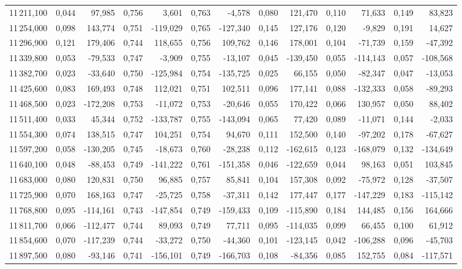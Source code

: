 \begin{longtable}{rrrrrrrrrrrrr}
11\,211,100 & 0,044 & 97,985 & 0,756 & 3,601 & 0,763 & -4,578 & 0,080 & 121,470 & 0,110 & 71,633 & 0,149 & 83,823\\
11\,254,000 & 0,098 & 143,774 & 0,751 & -119,029 & 0,765 & -127,340 & 0,145 & 127,176 & 0,120 & -9,829 & 0,191 & 14,627\\
11\,296,900 & 0,121 & 179,406 & 0,744 & 118,655 & 0,756 & 109,762 & 0,146 & 178,001 & 0,104 & -71,739 & 0,159 & -47,392\\
11\,339,800 & 0,053 & -79,533 & 0,747 & -3,909 & 0,755 & -13,107 & 0,045 & -139,450 & 0,055 & -114,143 & 0,057 & -108,568\\
11\,382,700 & 0,023 & -33,640 & 0,750 & -125,984 & 0,754 & -135,725 & 0,025 & 66,155 & 0,050 & -82,347 & 0,047 & -13,053\\
11\,425,600 & 0,083 & 169,493 & 0,748 & 112,021 & 0,751 & 102,511 & 0,096 & 177,141 & 0,088 & -132,333 & 0,058 & -89,293\\
11\,468,500 & 0,023 & -172,208 & 0,753 & -11,072 & 0,753 & -20,646 & 0,055 & 170,422 & 0,066 & 130,957 & 0,050 & 88,402\\
11\,511,400 & 0,033 & 45,344 & 0,752 & -133,787 & 0,755 & -143,094 & 0,065 & 77,420 & 0,089 & -11,071 & 0,144 & -2,033\\
11\,554,300 & 0,074 & 138,515 & 0,747 & 104,251 & 0,754 & 94,670 & 0,111 & 152,500 & 0,140 & -97,202 & 0,178 & -67,627\\
11\,597,200 & 0,058 & -130,205 & 0,745 & -18,673 & 0,760 & -28,238 & 0,112 & -162,615 & 0,123 & -168,079 & 0,132 & -134,649\\
11\,640,100 & 0,048 & -88,453 & 0,749 & -141,222 & 0,761 & -151,358 & 0,046 & -122,659 & 0,044 & 98,163 & 0,051 & 103,845\\
11\,683,000 & 0,080 & 120,831 & 0,750 & 96,885 & 0,757 & 85,841 & 0,104 & 157,308 & 0,092 & -75,972 & 0,128 & -37,507\\
11\,725,900 & 0,070 & 168,163 & 0,747 & -25,725 & 0,758 & -37,311 & 0,142 & 177,447 & 0,177 & -147,229 & 0,183 & -115,142\\
11\,768,800 & 0,095 & -114,161 & 0,743 & -147,854 & 0,749 & -159,433 & 0,109 & -115,890 & 0,184 & 144,485 & 0,156 & 164,666\\
11\,811,700 & 0,066 & -112,477 & 0,744 & 89,093 & 0,749 & 77,711 & 0,095 & -114,035 & 0,099 & 66,455 & 0,100 & 61,912\\
11\,854,600 & 0,070 & -117,239 & 0,744 & -33,272 & 0,750 & -44,360 & 0,101 & -123,145 & 0,042 & -106,288 & 0,096 & -45,703\\
11\,897,500 & 0,080 & -93,146 & 0,741 & -156,101 & 0,749 & -166,703 & 0,108 & -84,356 & 0,085 & 152,755 & 0,084 & -117,571\\

\end{longtable}
